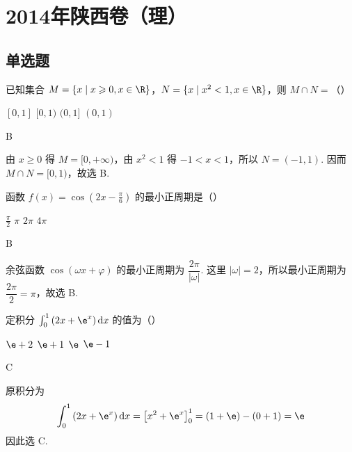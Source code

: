 \chapter{2014年陕西卷（理）}

\section{单选题}

\begin{problem}
已知集合 \(M = \{x \mid x \geqslant 0, x \in \R\}\)，\(N = \{x \mid x^2 < 1, x \in \R\}\)，则 \(M \cap N =\)（\quad）

\choices
    {\([0,1]\)}
    {\([0,1)\)}
    {\((0,1]\)}
    {\((0,1)\)}
\end{problem}

\begin{answer}
B
\end{answer}

\begin{solution}
由 \(x\geqslant0\) 得 \(M=[0,+\infty)\)，由 \(x^{2}<1\) 得 \(-1<x<1\)，所以 \(N=(-1,1)\). 因而 \(M\cap N=[0,1)\)，故选 B.
\end{solution}

\begin{problem}
函数 \(f(x) = \cos \left(2x - \frac{\pi}{6}\right)\) 的最小正周期是（\quad）

\choices
    {\(\frac{\pi}{2}\)}
    {\(\pi\)}
    {\(2\pi\)}
    {\(4\pi\)}
\end{problem}

\begin{answer}
B
\end{answer}

\begin{solution}
余弦函数 \(\cos(\omega x+\varphi)\) 的最小正周期为 \(\dfrac{2\pi}{|\omega|}\). 这里 \(|\omega|=2\)，所以最小正周期为 \(\dfrac{2\pi}{2}=\pi\)，故选 B.
\end{solution}

\begin{problem}
定积分 \(\int_{0}^{1}\left(2x + \e^{x}\right)\mathrm{d}x\) 的值为（\quad）

\choices
    {\(\e + 2\)}
    {\(\e + 1\)}
    {\(\e\)}
    {\(\e - 1\)}
\end{problem}

\begin{answer}
C
\end{answer}

\begin{solution}
原积分为
\[
\int_{0}^{1}\left(2x+\e^{x}\right)\mathrm{d}x
=\left[x^{2}+\e^{x}\right]_{0}^{1}
=(1+\e)-(0+1)=\e
\]
因此选 C.
\end{solution}

